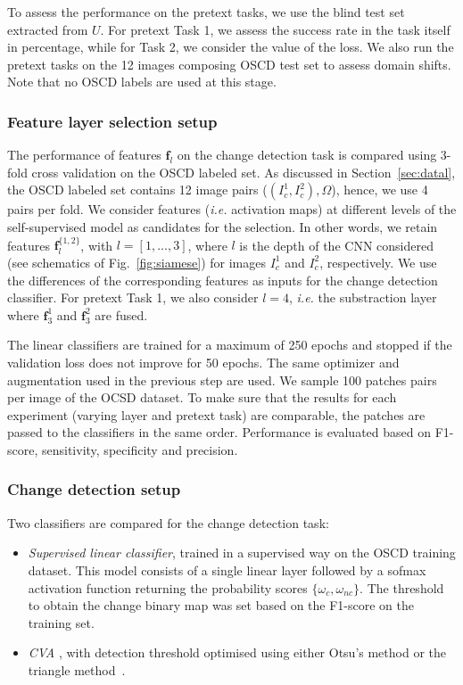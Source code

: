 \documentclass[runningheads]{llncs}
\begin{document}
\vspace{0.2cm}

To assess the performance on the pretext tasks, we use the blind test set extracted from $U$. For pretext Task 1, we assess the success rate in the task itself in percentage, while for Task 2, we consider the value of the loss. We also run the pretext tasks on the {12} images composing OSCD test set {to assess domain shifts}. Note that no OSCD labels are used at this stage.


\subsubsection{Feature layer selection setup} 
The performance of features $\mathbf{f}_l$ on the change detection task is compared using 3-fold cross validation on the OSCD labeled set. As discussed in Section~\ref{sec:datal}, the OSCD labeled set contains 12 image pairs ($(I_c^1, I_c^2), \Omega$), hence, we use 4 pairs per fold. We consider features (\emph{i.e.} activation maps) at different levels of the self-supervised model as candidates for the selection. In other words, we retain features $\mathbf{f}^{\{1,2\}}_l$, with $l=[1,...,3]$, where $l$ is the depth of the CNN considered (see schematics of Fig.~\ref{fig:siamese}) for images $I^1_c$ and $I^2_c$, respectively. We use the differences of the corresponding features as inputs for the change detection classifier. For pretext Task 1, we also consider $l=4$, \emph{i.e.} the substraction layer where $\mathbf{f}^1_3$ and $\mathbf{f}^2_3$ are fused.

{The linear classifiers} are trained for a maximum of 250 epochs and stopped if the validation loss does not improve for 50 epochs. The same optimizer and augmentation used in the previous step are used.
We sample 100 patches pairs per image of the OCSD dataset. 
To make sure that the results for each experiment (varying layer and pretext task) are comparable, the patches are passed to the classifiers in the same order. Performance is evaluated based on F1-score, sensitivity, specificity and precision. 

\subsubsection{Change detection setup} 
Two classifiers are compared for the change detection task: 
\begin{itemize}
    \item \textit{Supervised linear classifier}, trained in a supervised way on the OSCD training dataset.   {This model consists of a single linear layer followed by a sofmax activation function returning the probability scores $\{\omega_{c}, \omega_{nc}\}$. The threshold to obtain the change binary map was set based on the F1-score on the training set.}
    
     \item \textit{CVA} \cite{Bruzzone:2013:cd_framework}, with detection threshold optimised using either Otsu's method or the triangle method~\cite{Rosin:2001:triangle}.
      
\end{itemize}
\end{document}
